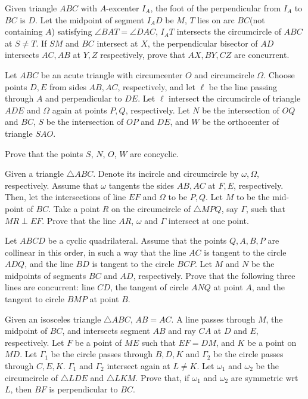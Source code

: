 \documentclass[11pt]{scrartcl}
\begin{document}
\begin{problem}[5835156231907738776]
Given triangle $ABC$ with $A$-excenter $I_A$, the foot of the perpendicular from $I_A$ to $BC$ is $D$. Let the midpoint of segment $I_AD$ be $M$, $T$ lies on arc $BC$(not containing $A$) satisfying $\angle BAT=\angle DAC$, $I_AT$ intersects the circumcircle of $ABC$ at $S\neq T$. If $SM$ and $BC$ intersect at $X$, the perpendicular bisector of $AD$ intersects $AC,AB$ at $Y,Z$ respectively, prove that $AX,BY,CZ$ are concurrent.
\end{problem}
\begin{problem}[5066939379306191291]
Let $ABC$ be an acute triangle with circumcenter $O$ and circumcircle $\Omega$. Choose points $D, E$ from sides $AB, AC$, respectively, and let $\ell$ be the line passing through $A$ and perpendicular to $DE$. Let $\ell$ intersect the circumcircle of triangle $ADE$ and $\Omega$ again at points $P, Q$, respectively. Let $N$ be the intersection of $OQ$ and $BC$, $S$ be the intersection of $OP$ and $DE$, and $W$ be the orthocenter of triangle $SAO$.

Prove that the points $S$, $N$, $O$, $W$ are concyclic.
\end{problem}
\begin{problem}[1965233157265405983]
Given a triangle $ \triangle{ABC} $. Denote its incircle and circumcircle by $ \omega, \Omega $, respectively. Assume that $ \omega $ tangents the sides $ AB, AC $ at $ F, E $, respectively. Then, let the intersections of line $ EF $ and $ \Omega $ to be $ P,Q $. Let $ M $ to be the mid-point of $ BC $. Take a point $ R $ on the circumcircle of $ \triangle{MPQ} $, say $ \Gamma $, such that $ MR \perp EF $. Prove that the line $ AR $, $ \omega $ and $ \Gamma $ intersect at one point.
\end{problem}
\begin{problem}[6193947856984766386]
Let $ABCD$ be a cyclic quadrilateral. Assume that the points $Q, A, B, P$ are collinear in this order, in such a way that the line $AC$ is tangent to the circle $ADQ$, and the line $BD$ is tangent to the circle $BCP$. Let $M$ and $N$ be the midpoints of segments $BC$ and $AD$, respectively. Prove that the following three lines are concurrent: line $CD$, the tangent of circle $ANQ$ at point $A$, and the tangent to circle $BMP$ at point $B$.
\end{problem}
\begin{problem}[1620616963605432410]
Given an isosceles triangle $\triangle ABC$, $AB=AC$. A line passes through $M$, the midpoint of $BC$, and intersects segment $AB$ and ray $CA$ at $D$ and $E$, respectively. Let $F$ be a point of $ME$ such that $EF=DM$, and $K$ be a point on $MD$. Let $\Gamma_1$ be the circle passes through $B,D,K$ and $\Gamma_2$ be the circle passes through $C,E,K$. $\Gamma_1$ and $\Gamma_2$ intersect again at $L \neq K$. Let $\omega_1$ and $\omega_2$ be the circumcircle of $\triangle LDE$ and $\triangle LKM$. Prove that, if $\omega_1$ and $\omega_2$ are symmetric wrt $L$, then $BF$ is perpendicular to $BC$.
\end{problem}
\end{document}
